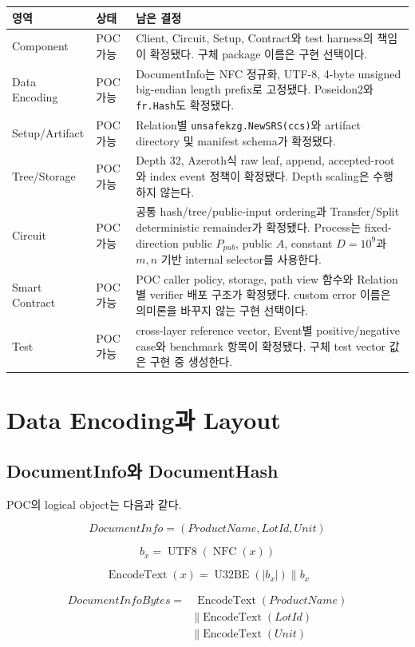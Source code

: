 \documentclass[11pt,a4paper]{extarticle}
\begin{document}
\begin{longtable}{@{}p{}p{}p{}@{}}
\toprule
영역 & 상태 & 남은 결정 \\
\midrule
\endhead
Component & POC 가능 & Client, Circuit, Setup, Contract와 test harness의 책임이 확정됐다. 구체 package 이름은 구현 선택이다. \\
Data Encoding & POC 가능 & DocumentInfo는 NFC 정규화, UTF-8, 4-byte unsigned big-endian length prefix로 고정됐다. Poseidon2와 \texttt{fr.Hash}도 확정됐다. \\
Setup/Artifact & POC 가능 & Relation별 \texttt{unsafekzg.NewSRS(ccs)}와 artifact directory 및 manifest schema가 확정됐다. \\
Tree/Storage & POC 가능 & Depth 32, Azeroth식 raw leaf, append, accepted-root와 index event 정책이 확정됐다. Depth scaling은 수행하지 않는다. \\
Circuit & POC 가능 & 공통 hash/tree/public-input ordering과 Transfer/Split deterministic remainder가 확정됐다. Process는 fixed-direction public $P_{pub}$, public $A$, constant $D=10^9$과 $m,n$ 기반 internal selector를 사용한다. \\
Smart Contract & POC 가능 & POC caller policy, storage, path view 함수와 Relation별 verifier 배포 구조가 확정됐다. custom error 이름은 의미론을 바꾸지 않는 구현 선택이다. \\
Test & POC 가능 & cross-layer reference vector, Event별 positive/negative case와 benchmark 항목이 확정됐다. 구체 test vector 값은 구현 중 생성한다. \\
\bottomrule
\end{longtable}

\section{Data Encoding과 Layout}

\subsection{DocumentInfo와 DocumentHash}

POC의 logical object는 다음과 같다.

\[
\mathit{DocumentInfo}=(ProductName,LotId,Unit)
\]

\[
 b_x=\operatorname{UTF8}(\operatorname{NFC}(x))
\]

\[
\operatorname{EncodeText}(x)
=\operatorname{U32BE}(|b_x|)
\mathbin{\|}b_x
\]

\[
\begin{aligned}
\mathit{DocumentInfoBytes}
={}&\operatorname{EncodeText}(ProductName)\\
&\mathbin{\|}\operatorname{EncodeText}(LotId)\\
&\mathbin{\|}\operatorname{EncodeText}(Unit)
\end{aligned}
\]
\end{document}
